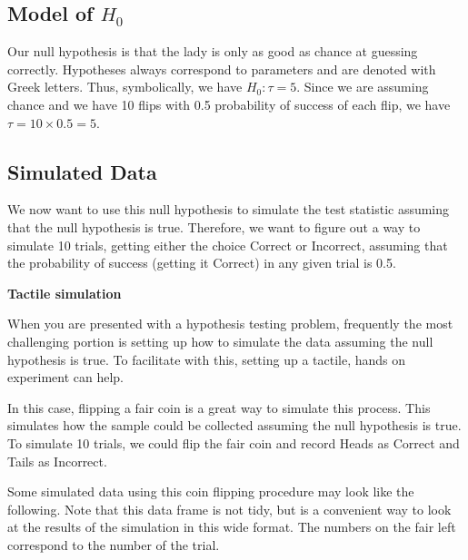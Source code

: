 \documentclass[]{tufte-book}
\theoremstyle{definition}
\theoremstyle{definition}
\theoremstyle{remark}
\begin{document}
\subsection{\texorpdfstring{Model of
\(H_0\)}{Model of H\_0}}\label{model-of-h_0}

Our null hypothesis is that the lady is only as good as chance at
guessing correctly. Hypotheses always correspond to parameters and are
denoted with Greek letters. Thus, symbolically, we have
\(H_0: \tau = 5\). Since we are assuming chance and we have 10 flips
with 0.5 probability of success of each flip, we have
\(\tau = 10 \times 0.5 = 5\).

\subsection{Simulated Data}\label{simulated-data}

We now want to use this null hypothesis to simulate the test statistic
assuming that the null hypothesis is true. Therefore, we want to figure
out a way to simulate 10 trials, getting either the choice Correct or
Incorrect, assuming that the probability of success (getting it Correct)
in any given trial is 0.5.

\textbf{Tactile simulation}

When you are presented with a hypothesis testing problem, frequently the
most challenging portion is setting up how to simulate the data assuming
the null hypothesis is true. To facilitate with this, setting up a
tactile, hands on experiment can help.

In this case, flipping a fair coin is a great way to simulate this
process. This simulates how the sample could be collected assuming the
null hypothesis is true. To simulate 10 trials, we could flip the fair
coin and record Heads as Correct and Tails as Incorrect.

Some simulated data using this coin flipping procedure may look like the
following. Note that this data frame is not tidy, but is a convenient
way to look at the results of the simulation in this wide format. The
numbers on the fair left correspond to the number of the trial.
\end{document}
